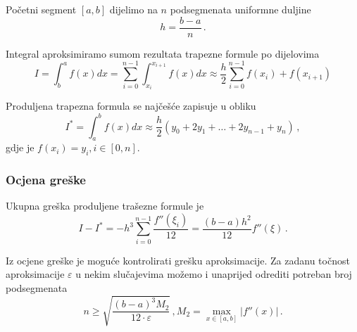Početni segment $[a,b]$ dijelimo na $n$ podsegmenata uniformne duljine
$$
h = \frac{b-a}{n}\,.
$$

Integral aproksimiramo sumom rezultata trapezne formule po dijelovima
$$
I = \int_{b}^{a} f(x)dx = \sum_{i=0}^{n-1} \int_{x_i}^{x_{i+1}}f(x)dx \approx \frac{h}{2} \sum_{i=0}^{n-1} f(x_i)+f(x_{i+1})
$$

Produljena trapezna formula se najčešće zapisuje u obliku
$$
I^* = \int_{a}^{b} f(x)dx \approx \frac{h}{2}(y_0+2y_1+\dots+2y_{n-1}+y_n)\,,
$$
gdje je $f(x_i) = y_i, i\in [0, n]$.



\subsubsection{Ocjena greške}

Ukupna greška produljene trašezne formule je
$$
I - I^* = -h^3 \sum_{i=0}^{n-1} \frac{f''(\xi_i)}{12} = \frac{(b-a)h^2}{12}f''(\xi)\,.
$$

Iz ocjene greške je moguće kontrolirati grešku aproksimacije.
Za zadanu točnost aproksimacije $\varepsilon$ u nekim slučajevima možemo i unaprijed odrediti potreban broj podsegmenata
$$
n \geq \sqrt{\frac{(b-a)^3M_2}{12 \cdot \varepsilon}}\,, M_2 = \max_{x\in[a,b]}|f''(x)|\,.
$$
